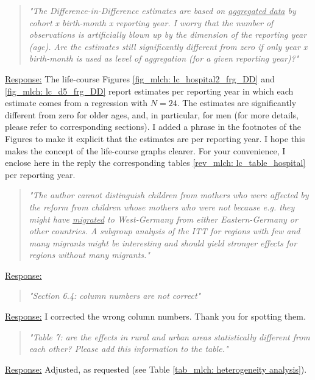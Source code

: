 % 
\begin{quote}
	\textit{"The Difference-in-Difference estimates are based on \underline{aggregated data} by cohort x birth-month x reporting year. I worry that the number of observations is artificially blown up by the dimension of the reporting year (age). Are the estimates still significantly different from zero if only year x birth-month is used as level of aggregation (for a given reporting year)?"}
\end{quote}
\underline{Response:} The life-course Figures \ref{fig_mlch: lc_hospital2_frg_DD} and \ref{fig_mlch: lc_d5_frg_DD} report estimates per reporting year in which each estimate comes from a regression with $N=24$. The estimates are significantly different from zero for older ages, and, in particular, for men (for more details, please refer to corresponding sections). I added a phrase in the footnotes of the Figures to make it explicit that the estimates are per reporting year. I hope this makes the concept of the life-course graphs clearer. For your convenience, I enclose here in the reply the corresponding tables \ref{rev_mlch: lc_table_hospital} per reporting year.







% 
\begin{quote}
	\textit{"The author cannot distinguish children from mothers who were affected by the reform from children whose mothers who were not because e.g. they might have \underline{migrated} to West-Germany from either Eastern-Germany or other countries. A subgroup analysis of the ITT for regions with few and many migrants might be interesting and should yield stronger effects for regions without many migrants."}
\end{quote}
\underline{Response:}

% 
\begin{quote}
	\textit{"Section 6.4: column numbers are not correct"}
\end{quote}
\underline{Response:} I corrected the wrong column numbers. Thank you for spotting them.

% 
\begin{quote}
	\textit{"Table 7: are the effects in rural and urban areas statistically different from each other? Please add this information to the table."}
\end{quote}
\underline{Response:} Adjusted, as requested (see Table \ref{tab_mlch: heterogeneity analysis}).

